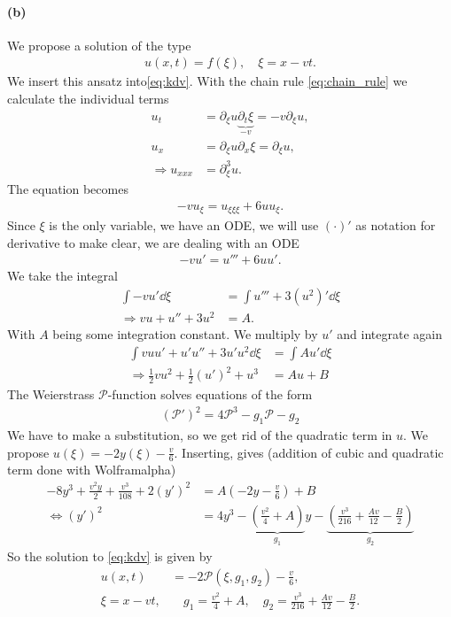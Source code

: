 \paragraph{(b)}
We propose a solution of the type 
\begin{align}
u(x,t)=f(\xi),\quad \xi= x-vt.
\end{align}
We insert this ansatz into\cref{eq:kdv}. With the chain rule \cref{eq:chain_rule} we calculate the individual terms
\begin{align}
u_t &= \partial_\xi u \underbrace{\partial_t \xi}_{-v}=-v \partial_\xi u,\\
u_x &= \partial_\xi u \partial_x \xi = \partial_\xi u ,\\
\Rightarrow u _{xxx}&= \partial_{\xi}^3 u.
\end{align}
The equation becomes 
\begin{align}
-v u_\xi = u_{\xi\xi\xi} + 6 u u_\xi.
\end{align}
Since $\xi$ is the only variable, we have an ODE, we will use $(\cdot)'$ as notation for derivative to make clear, we are dealing with an ODE
\begin{align}
-v u' = u''' +6 uu'.\label{eq:4b_ode}
\end{align}
We take the integral
\begin{align}
\int -v u' \dd\xi &= \int u''' +3(u^2)' \dd\xi\\
\Rightarrow v u+u''+3u^2 &= A.
\end{align}
With $A$ being some integration constant.  We multiply by $u'$ and integrate again
\begin{align}
\int vuu' +u'u'' + 3u'u^2 \dd\xi&= \int Au' \dd\xi\\
\Rightarrow \frac 12 vu^2 + \frac 12 (u')^2  + u^3&= Au +B
\end{align}
The Weierstrass $\mathscr{P}$-function solves equations of the form
\begin{align}
(\mathscr{P}')^2 = 4\mathscr{P}^3-g_1\mathscr{P}-g_2
\end{align}
We have to make a substitution, so we get rid of the quadratic term in $u$.
We propose $u(\xi)=-2y(\xi)-\frac v6$. Inserting, gives (addition of cubic and quadratic term done with Wolframalpha)
\begin{align}
-8y^3+\frac{v^2y}{2}+\frac{v^3}{108} +2(y')^2&=A\left(-2y-\frac v6\right) +B\\
\iff (y')^2 &= 4y^3-\underbrace{\left(\frac{v^2}{4}+A\right)}_{g_1}y - \underbrace{\left(\frac{v^3}{216} +\frac{Av}{12} - \frac B2\right)}_{g_2}
\end{align}
So the solution to \cref{eq:kdv} is given by
\begin{align}
u(x,t) &= -2\mathscr{P}(\xi,g_1,g_2) - \frac v6, \label{eq:sol_4b}\\
\xi = x-vt,& \quad g_1=\frac{v^2}{4}+A, \quad g_2=\frac{v^3}{216} +\frac{Av}{12} - \frac B2.
\end{align}
